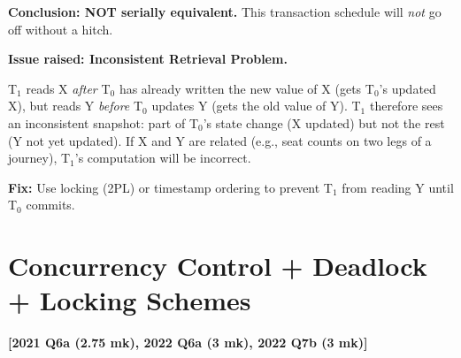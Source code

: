 \documentclass[11pt,a4paper]{article}
\newcommand{\qref}[1]{\textbf{\textcolor{examblue}{[#1]}}}
\newcommand{\mk}[1]{\textcolor{slidegray}{\small(#1 mk)}}
\begin{document}
\begin{answerbox}
\textbf{Conclusion: NOT serially equivalent.} This transaction schedule will \emph{not} go off without a hitch.

\textbf{Issue raised: Inconsistent Retrieval Problem.}

T$_1$ reads X \emph{after} T$_0$ has already written the new value of X (gets T$_0$'s updated X), but reads Y \emph{before} T$_0$ updates Y (gets the old value of Y). T$_1$ therefore sees an inconsistent snapshot: part of T$_0$'s state change (X updated) but not the rest (Y not yet updated). If X and Y are related (e.g., seat counts on two legs of a journey), T$_1$'s computation will be incorrect.

\textbf{Fix:} Use locking (2PL) or timestamp ordering to prevent T$_1$ from reading Y until T$_0$ commits.
\end{answerbox}

\section{Concurrency Control + Deadlock + Locking Schemes}
\qref{2021 Q6a \mk{2.75}, 2022 Q6a \mk{3}, 2022 Q7b \mk{3}}
\end{document}
